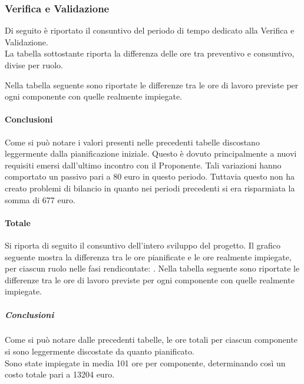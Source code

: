 \subsubsection{Verifica e Validazione}
Di seguito è riportato il consuntivo del periodo di tempo dedicato alla Verifica e Validazione.\\
La tabella sottostante riporta la differenza delle ore tra preventivo e consuntivo, divise per ruolo.


Nella tabella seguente sono riportate le differenze tra le ore di lavoro previste per ogni componente con quelle realmente impiegate.


\paragraph{Conclusioni}
Come si può notare i valori presenti nelle precedenti tabelle discostano leggermente dalla pianificazione iniziale. Questo è dovuto principalmente a nuovi requisiti emersi dall'ultimo incontro con il Proponente.
Tali variazioni hanno comportato un passivo pari a 80 euro in questo periodo. Tuttavia questo non ha creato problemi di bilancio in quanto nei periodi precedenti si era risparmiata la somma di 677 euro.  

\paragraph{Totale}
Si riporta di seguito il consuntivo dell'intero sviluppo del progetto.
Il grafico seguente mostra la differenza tra le ore pianificate e le ore realmente impiegate, per ciascun ruolo nelle fasi rendicontate: .
Nella tabella seguente sono riportate le differenze tra le ore di lavoro previste per ogni componente con quelle realmente impiegate.



\subparagraph{Conclusioni}
Come si può notare dalle precedenti tabelle, le ore totali per ciascun componente si sono leggermente discostate da quanto pianificato.\\
Sono state impiegate in media 101 ore per componente, determinando così un costo totale pari a 13204 euro.



